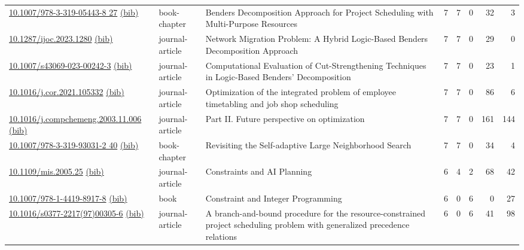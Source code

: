 {\begin{longtable}{p{5cm}lp{11cm}rrrrr}
\href{http://dx.doi.org/10.1007/978-3-319-05443-8_27}{10.1007/978-3-319-05443-8 27} \href{https://www.doi2bib.org/bib/10.1007/978-3-319-05443-8_27}{(bib)} & book-chapter & Benders Decomposition Approach for Project Scheduling with Multi-Purpose Resources & 7 & 7 & 0 & 32 & 3 \\
\href{http://dx.doi.org/10.1287/ijoc.2023.1280}{10.1287/ijoc.2023.1280} \href{https://www.doi2bib.org/bib/10.1287/ijoc.2023.1280}{(bib)} & journal-article & Network Migration Problem: A Hybrid Logic-Based Benders Decomposition Approach & 7 & 7 & 0 & 29 & 0 \\
\href{http://dx.doi.org/10.1007/s43069-023-00242-3}{10.1007/s43069-023-00242-3} \href{https://www.doi2bib.org/bib/10.1007/s43069-023-00242-3}{(bib)} & journal-article & Computational Evaluation of Cut-Strengthening Techniques in Logic-Based Benders' Decomposition & 7 & 7 & 0 & 23 & 1 \\
\href{http://dx.doi.org/10.1016/j.cor.2021.105332}{10.1016/j.cor.2021.105332} \href{https://www.doi2bib.org/bib/10.1016/j.cor.2021.105332}{(bib)} & journal-article & Optimization of the integrated problem of employee timetabling and job shop scheduling & 7 & 7 & 0 & 86 & 6 \\
\href{http://dx.doi.org/10.1016/j.compchemeng.2003.11.006}{10.1016/j.compchemeng.2003.11.006} \href{https://www.doi2bib.org/bib/10.1016/j.compchemeng.2003.11.006}{(bib)} & journal-article & Part II. Future perspective on optimization & 7 & 7 & 0 & 161 & 144 \\
\href{http://dx.doi.org/10.1007/978-3-319-93031-2_40}{10.1007/978-3-319-93031-2 40} \href{https://www.doi2bib.org/bib/10.1007/978-3-319-93031-2_40}{(bib)} & book-chapter & Revisiting the Self-adaptive Large Neighborhood Search & 7 & 7 & 0 & 34 & 4 \\
\href{http://dx.doi.org/10.1109/mis.2005.25}{10.1109/mis.2005.25} \href{https://www.doi2bib.org/bib/10.1109/mis.2005.25}{(bib)} & journal-article & Constraints and AI Planning & 6 & 4 & 2 & 68 & 42 \\
\href{http://dx.doi.org/10.1007/978-1-4419-8917-8}{10.1007/978-1-4419-8917-8} \href{https://www.doi2bib.org/bib/10.1007/978-1-4419-8917-8}{(bib)} & book & Constraint and Integer Programming & 6 & 0 & 6 & 0 & 27 \\
\href{http://dx.doi.org/10.1016/s0377-2217(97)00305-6}{10.1016/s0377-2217(97)00305-6} \href{https://www.doi2bib.org/bib/10.1016/s0377-2217(97)00305-6}{(bib)} & journal-article & A branch-and-bound procedure for the resource-constrained project scheduling problem with generalized precedence relations & 6 & 0 & 6 & 41 & 98 \\

\end{longtable}}
